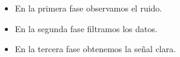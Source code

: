 \documentclass{beamer}
\begin{document}
\begin{frame}
\begin{itemize}
    \item<+-> En la primera fase observamos el ruido.
    \item<+-> \alert<2>{En la segunda fase filtramos los datos.}
    \item<+-> En la tercera fase obtenemos la señal clara.
\end{itemize}
\end{frame}
\end{document}
